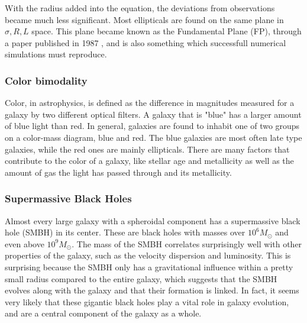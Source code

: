 With the radius added into the equation, the deviations from observations became much less significant. Most ellipticals are found on the same plane in ${\sigma, R, L}$ space. This plane became known as the Fundamental Plane (FP), through a paper published in 1987 \parencite{Djorgovski1987}, and is also something which successfull numerical simulations must reproduce.

\subsubsection{Color bimodality}
Color, in astrophysics, is defined as the difference in magnitudes measured for a galaxy by two different optical filters. A galaxy that is "blue" has a larger amount of blue light than red. In general, galaxies are found to inhabit one of two groups on a color-mass diagram, blue and red. The blue galaxies are most often late type galaxies, while the red ones are mainly ellipticals. There are many factors that contribute to the color of a galaxy, like stellar age and metallicity as well as the amount of gas the light has passed through and its metallicity.

\subsubsection{Supermassive Black Holes}
Almost every large galaxy with a spheroidal component has a supermassive black hole (SMBH) in its center. These are black holes with masses over $10^6 M_{\odot}$ and even above $10^9 M_{\odot}$. The mass of the SMBH correlates surprisingly well with other properties of the galaxy, such as the velocity dispersion and luminosity. This is surprising because the SMBH only has a gravitational influence within a pretty small radius compared to the entire galaxy, which suggests that the SMBH evolves along with the galaxy and that their formation is linked. In fact, it seems very likely that these gigantic black holes play a vital role in galaxy evolution, and are a central component of the galaxy as a whole.